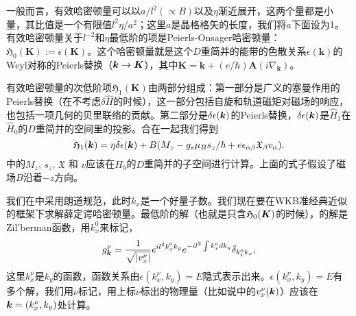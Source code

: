 一般而言，有效哈密顿量可以以$a/l^2 (\propto B)$以及$\eta$渐近展开，这两个量都是小量，其比值是一个有限值$l^2\eta/a^2$；这里$a$是晶格格矢的长度，我们将$a$下面设为1。有效哈密顿量关于$l^{-2}$和$\eta$最低阶的项是Peierls-Onsager哈密顿量：$\mathfrak{H}_{0}(\boldsymbol{K}):=\epsilon(\boldsymbol{K})$。这个哈密顿量就是这个$D$重简并的能带的色散关系$\epsilon(\boldsymbol{k})$的Weyl对称的Peierls替换（$\boldsymbol{k} \rightarrow \boldsymbol{K}$），其中$\boldsymbol{K}=\boldsymbol{k}+(e/\hbar)\boldsymbol{A}(i\nabla_{\boldsymbol{k}})$。

有效哈密顿量的次低阶项$\mathfrak{H}_{1}(\boldsymbol{K})$由两部分组成：第一部分是广义的塞曼作用的Peierls替换（在不考虑$\delta \hat{H}$的时候），这一部分包括自旋和轨道磁矩对磁场的响应，也包括一项几何的贝里联络的贡献。第二部分是$\delta \epsilon(\boldsymbol{k})$的Peierls替换，$\delta \epsilon(\boldsymbol{k})$是$\hat{H}_1$在$\hat{H}_0$的$D$重简并的空间里的投影。合在一起我们得到
\begin{equation}
\mathfrak{H}_1(\boldsymbol{k}) = \eta\delta \epsilon(\boldsymbol{k})+B(M_{z}-g_s\mu_{B}s_{z}/\hbar+e\epsilon_{\alpha\beta}\mathfrak{X}_{\beta}v_{\alpha}). \label{effham1}
\end{equation}
中的$M_z$, $s_z$, $\mathfrak{X}$ 和 $v$应该在$\hat{H}_0$的$D$重简并的子空间进行计算。上面的式子假设了磁场$B$沿着$-z$方向。

我们在中采用朗道规范，此时$k_x$是一个好量子数。我们现在要在WKB准经典近似的框架下求解薛定谔哈密顿量。最低阶的解（也就是只含$\mathfrak{H}_0(\boldsymbol{K})$的时候），的解是Zil'berman函数\cite{zilberman}，用$k_x^0$来标记，
\begin{equation}
    g_{\bk}^\nu=\frac{1}{\sqrt{|v_x^\nu|}}e^{il^2k_x^0k_y}e^{-il^{2}\int k_x^\nu dk_y}\delta_{k_x^0 k_x},\la{zilberman}
\end{equation}
这里$k_x^\nu$是$k_y$的函数，函数关系由$\epsilon(k_x^\nu,k_y)=E$隐式表示出来。$\epsilon(k_x^\nu,k_y)=E$有多个解，我们用$\nu$标记，用上标$\nu$标出的物理量（比如说中的$v_x^\nu(\boldsymbol{k})$）应该在$\boldsymbol{k} = (k_x^\nu, k_y)$处计算。

